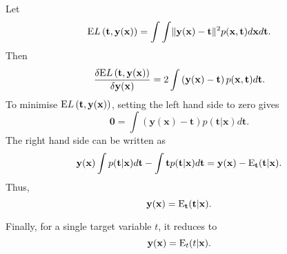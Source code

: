 

\subsection{}
Let
%
\begin{equation}
{\rm E} L\left( \mathbf{t}, \mathbf{y} (\mathbf{x}) \right) = \int \int \lVert \mathbf{y}(\mathbf{x}) - \mathbf{t} \rVert ^ 2 p(\mathbf{x}, \mathbf{t}) d\mathbf{x} d\mathbf{t}.
\end{equation}
%
Then
%
\begin{equation}
\frac{\delta {\rm E} L\left( \mathbf{t}, \mathbf{y} (\mathbf{x}) \right)}{\delta \mathbf{y} (\mathbf{x})} = 2 \int \left( \mathbf{y} (\mathbf{x}) - \mathbf{t} \right) p(\mathbf{x}, \mathbf{t}) d\mathbf{t}.
\end{equation}
%
To minimise ${\rm E} L\left( \mathbf{t}, \mathbf{y} (\mathbf{x}) \right)$, setting the left hand side to zero gives
%
\begin{equation}
\mathbf{0} = \int \left( \mathbf{y}(\mathbf{x}) - \mathbf{t} \right) p(\mathbf{t} | \mathbf{x}) d\mathbf{t}.
\end{equation}
%
The right hand side can be written as
%
\begin{equation}
\mathbf{y}(\mathbf{x}) \int p(\mathbf{t} | \mathbf{x}) d\mathbf{t} - \int \mathbf{t} p(\mathbf{t} | \mathbf{x}) d\mathbf{t} = \mathbf{y}(\mathbf{x}) - {\rm E}_\mathbf{t} (\mathbf{t} | \mathbf{x}).
\end{equation}
%
Thus,
%
\begin{equation}
\mathbf{y}(\mathbf{x}) = {\rm E}_\mathbf{t} (\mathbf{t} | \mathbf{x}).
\end{equation}
%

Finally, for a single target variable $t$, it reduces to 
%
\begin{equation}
\mathbf{y}(\mathbf{x}) = {\rm E}_t (t | \mathbf{x}).
\end{equation}
%


